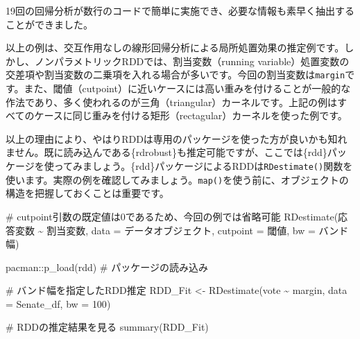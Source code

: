\documentclass[
  a4paper,
  pandoc,
  ja=standard,
  jafont=haranoaji]{bxjsbook}
\newenvironment{Shaded}{\begin{snugshade}}{\end{snugshade}}
\newcommand{\AttributeTok}[1]{\textcolor[rgb]{0.00,0.48,0.65}{#1}}
\newcommand{\CommentTok}[1]{\textcolor[rgb]{0.37,0.37,0.37}{#1}}
\newcommand{\DecValTok}[1]{\textcolor[rgb]{0.68,0.00,0.00}{#1}}
\newcommand{\FunctionTok}[1]{\textcolor[rgb]{0.28,0.35,0.67}{#1}}
\newcommand{\NormalTok}[1]{\textcolor[rgb]{0.00,0.48,0.65}{#1}}
\newcommand{\OtherTok}[1]{\textcolor[rgb]{0.00,0.48,0.65}{#1}}
\newcommand{\SpecialCharTok}[1]{\textcolor[rgb]{0.37,0.37,0.37}{#1}}
\begin{document}
19回の回帰分析が数行のコードで簡単に実施でき、必要な情報も素早く抽出することができました。

以上の例は、交互作用なしの線形回帰分析による局所処置効果の推定例です。しかし、ノンパラメトリックRDDでは、割当変数（running
variable）処置変数の交差項や割当変数の二乗項を入れる場合が多いです。今回の割当変数は\texttt{margin}です。また、閾値（cutpoint）に近いケースには高い重みを付けることが一般的な作法であり、多く使われるのが三角（triangular）カーネルです。上記の例はすべてのケースに同じ重みを付ける矩形（rectagular）カーネルを使った例です。

以上の理由により、やはりRDDは専用のパッケージを使った方が良いかも知れません。既に読み込んである\{rdrobust\}も推定可能ですが、ここでは\{rdd\}パッケージを使ってみましょう。\{rdd\}パッケージによるRDDは\texttt{RDestimate()}関数を使います。実際の例を確認してみましょう。\texttt{map()}を使う前に、オブジェクトの構造を把握しておくことは重要です。

\begin{Shaded}
\begin{Highlighting}[numbers=left,,]
\CommentTok{\# cutpoint引数の既定値は0であるため、今回の例では省略可能}
\FunctionTok{RDestimate}\NormalTok{(応答変数 }\SpecialCharTok{\textasciitilde{}}\NormalTok{ 割当変数, }\AttributeTok{data =}\NormalTok{ データオブジェクト, }\AttributeTok{cutpoint =}\NormalTok{ 閾値, }\AttributeTok{bw =}\NormalTok{ バンド幅)}
\end{Highlighting}
\end{Shaded}

\begin{Shaded}
\begin{Highlighting}[numbers=left,,]
\NormalTok{pacman}\SpecialCharTok{::}\FunctionTok{p\_load}\NormalTok{(rdd) }\CommentTok{\# パッケージの読み込み}

\CommentTok{\# バンド幅を指定したRDD推定}
\NormalTok{RDD\_Fit }\OtherTok{\textless{}{-}} \FunctionTok{RDestimate}\NormalTok{(vote }\SpecialCharTok{\textasciitilde{}}\NormalTok{ margin, }\AttributeTok{data =}\NormalTok{ Senate\_df, }\AttributeTok{bw =} \DecValTok{100}\NormalTok{)}

\CommentTok{\# RDDの推定結果を見る}
\FunctionTok{summary}\NormalTok{(RDD\_Fit)}
\end{Highlighting}
\end{Shaded}
\end{document}
